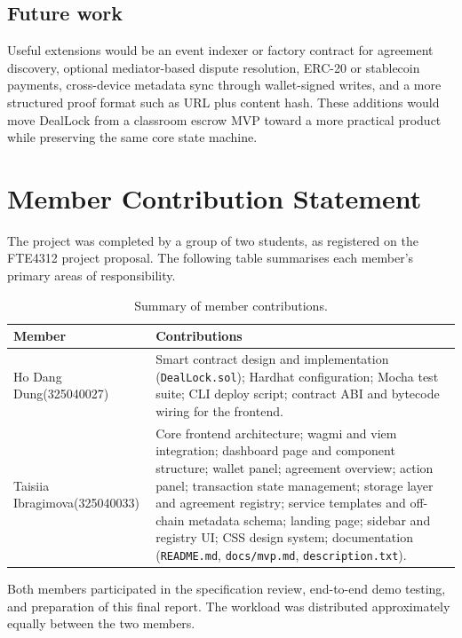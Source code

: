 \documentclass[12pt,a4paper]{article}
\begin{document}
\subsection{Future work}

Useful extensions would be an event indexer or factory contract for agreement
discovery, optional mediator-based dispute resolution, ERC-20 or stablecoin
payments, cross-device metadata sync through wallet-signed writes, and a more
structured proof format such as URL plus content hash. These additions would move
DealLock from a classroom escrow MVP toward a more practical product while
preserving the same core state machine.

\newpage
\section{Member Contribution Statement}
\label{sec:contributions}

The project was completed by a group of two students, as registered on the
FTE4312 project proposal.
The following table summarises each member's primary areas of responsibility.

\begin{table}[H]
\centering
\renewcommand{\arraystretch}{1.4}
\small
\begin{tabular}{p{} p{}}
\toprule
\textbf{Member} & \textbf{Contributions} \\
\midrule
Ho Dang Dung\newline\footnotesize{(325040027)}
& Smart contract design and implementation (\texttt{DealLock.sol}); Hardhat
  configuration; Mocha test suite; CLI deploy script; contract ABI and bytecode
  wiring for the frontend. \\
\addlinespace
Taisiia Ibragimova\newline\footnotesize{(325040033)}
& Core frontend architecture; wagmi and viem integration; dashboard page and
  component structure; wallet panel; agreement overview; action panel;
  transaction state management; storage layer and agreement registry; service
  templates and off-chain metadata schema; landing page; sidebar and registry UI;
  CSS design system; documentation (\texttt{README.md}, \texttt{docs/mvp.md},
  \texttt{description.txt}). \\
\bottomrule
\end{tabular}
\caption{Summary of member contributions.}
\label{tab:contributions}
\end{table}

Both members participated in the specification review, end-to-end demo testing,
and preparation of this final report.
The workload was distributed approximately equally between the two members.

\end{document}
